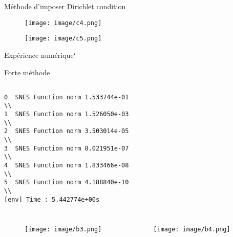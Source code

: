 \documentclass[11pt]{beamer}
\begin{document}
\begin{frame}{Méthode d'imposer Dirichlet condition}

\begin{figure}
\texttt{[image: image/c4.png]}
\end{figure}

\pause

\begin{figure}
\texttt{[image: image/c5.png]}
\end{figure}

\end{frame}


\begin{frame}{Expérience numérique}`

\begin{block}{Forte méthode}

\begin{verbatim}

0  SNES Function norm 1.533744e-01
\\
1  SNES Function norm 1.526050e-03
\\
2  SNES Function norm 3.503014e-05
\\
3  SNES Function norm 8.021951e-07
\\
4  SNES Function norm 1.833466e-08
\\
5  SNES Function norm 4.188840e-10
\\
[env] Time : 5.442774e+00s

\end{verbatim}
\end{block}


\begin{columns}
\begin{figure}
\texttt{[image: image/b3.png]}
\end{figure}
\begin{figure}
\texttt{[image: image/b4.png]}
\end{figure}
\end{columns}

\end{frame}
\end{document}
